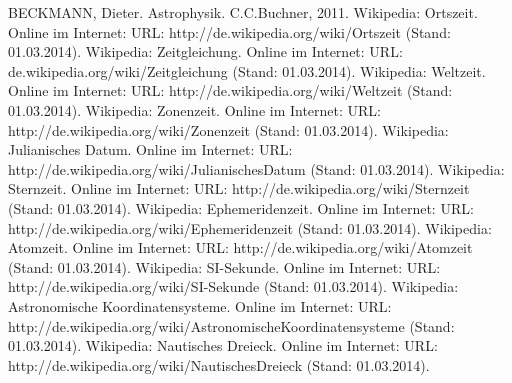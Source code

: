 \documentclass[titlepage]{scrartcl}
\begin{document}
\newpage

\begin{thebibliography}{9}
 BECKMANN, Dieter. Astrophysik. C.C.Buchner, 2011.
 Wikipedia: Ortszeit. Online im Internet: URL: http://de.wikipedia.org/wiki/Ortszeit (Stand: 01.03.2014). 
 Wikipedia: Zeitgleichung. Online im Internet: URL: de.wikipedia.org/wiki/Zeitgleichung (Stand: 01.03.2014). 
 Wikipedia: Weltzeit. Online im Internet: URL: http://de.wikipedia.org/wiki/Weltzeit (Stand: 01.03.2014). 
 Wikipedia: Zonenzeit. Online im Internet: URL: http://de.wikipedia.org/wiki/Zonenzeit (Stand: 01.03.2014). 
 Wikipedia: Julianisches Datum. Online im Internet: URL: http://de.wikipedia.org/wiki/JulianischesDatum (Stand: 01.03.2014). 
 Wikipedia: Sternzeit. Online im Internet: URL: http://de.wikipedia.org/wiki/Sternzeit (Stand: 01.03.2014). 
 Wikipedia: Ephemeridenzeit. Online im Internet: URL: http://de.wikipedia.org/wiki/Ephemeridenzeit (Stand: 01.03.2014). 
 Wikipedia: Atomzeit. Online im Internet: URL: http://de.wikipedia.org/wiki/Atomzeit (Stand: 01.03.2014). 
 Wikipedia: SI-Sekunde. Online im Internet: URL: http://de.wikipedia.org/wiki/SI-Sekunde (Stand: 01.03.2014). 
 Wikipedia: Astronomische Koordinatensysteme. Online im Internet: URL: http://de.wikipedia.org/wiki/AstronomischeKoordinatensysteme (Stand: 01.03.2014). 
 Wikipedia: Nautisches Dreieck. Online im Internet: URL: http://de.wikipedia.org/wiki/NautischesDreieck (Stand: 01.03.2014). 

\end{thebibliography}
\end{document}
